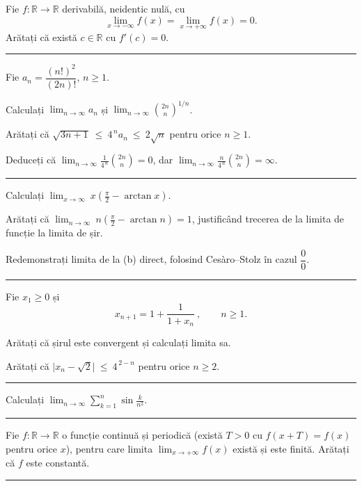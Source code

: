 Fie $f:\mathbb{R}\to\mathbb{R}$ derivabilă, neidentic nulă, cu
\[ \lim_{x\to-\infty}f(x)=\lim_{x\to+\infty}f(x)=0 . \]
Arătați că există $c\in\mathbb{R}$ cu $f'(c)=0$.
\vspace{1mm}\hrule

Fie $a_n=\dfrac{(n!)^{2}}{(2n)!}$, $n\ge1$.
\begin{parti}
  \item Calculați $\displaystyle\lim_{n\to\infty}a_n$ și $\displaystyle\lim_{n\to\infty}\binom{2n}{n}^{\!1/n}$.
  \item Arătați că $\sqrt{3n+1}\ \le\ 4^{\,n}a_n\ \le\ 2\sqrt n$ pentru orice $n\ge1$.
  \item Deduceți că $\displaystyle\lim_{n\to\infty}\frac{1}{4^{\,n}}\binom{2n}{n}=0$, dar $\displaystyle\lim_{n\to\infty}\frac{n}{4^{\,n}}\binom{2n}{n}=\infty$.
\end{parti}
\vspace{1mm}\hrule

\begin{parti}
  \item Calculați $\displaystyle\lim_{x\to\infty}\ x\left(\frac{\pi}{2}-\arctan x\right)$.
  \item Arătați că $\displaystyle\lim_{n\to\infty}\ n\left(\frac{\pi}{2}-\arctan n\right)=1$, justificând trecerea de la limita de funcție la limita de șir.
  \item Redemonstrați limita de la (b) direct, folosind Cesàro--Stolz în cazul $\dfrac00$.
\end{parti}
\vspace{1mm}\hrule

Fie $x_{1}\ge0$ și
\[ x_{n+1}=1+\frac{1}{1+x_{n}}\ ,\qquad n\ge1 . \]
\begin{parti}
  \item Arătați că șirul este convergent și calculați limita sa.
  \item Arătați că $\bigl|x_{n}-\sqrt2\bigr|\ \le\ 4^{\,2-n}$ pentru orice $n\ge2$.
\end{parti}
\vspace{1mm}\hrule

Calculați $\displaystyle\lim_{n\to\infty}\sum_{k=1}^{n}\sin\frac{k}{n^2}$.
\vspace{1mm}\hrule

Fie $f:\mathbb{R}\to\mathbb{R}$ o funcție continuă și periodică (există $T>0$ cu $f(x+T)=f(x)$ pentru orice $x$), pentru care limita $\displaystyle\lim_{x\to+\infty}f(x)$ există și este finită. Arătați că $f$ este constantă.
\vspace{1mm}\hrule

